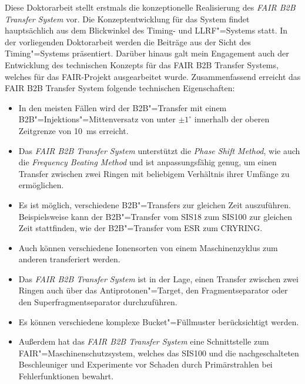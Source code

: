 Diese Doktorarbeit stellt erstmals die konzeptionelle Realisierung des \textit{FAIR B2B Transfer System} vor. Die Konzeptentwicklung für das System findet hauptsächlich aus dem Blickwinkel des Timing- und LLRF"=Systems statt. In der vorliegenden Doktorarbeit werden die Beiträge aus der Sicht des Timing"=Systems präsentiert. Darüber hinaus galt mein Engagement auch der Entwicklung des technischen Konzepts für das FAIR B2B Transfer Systems, welches für das FAIR-Projekt ausgearbeitet wurde. Zusammenfassend erreicht das FAIR B2B Transfer System folgende technischen Eigenschaften:
\begin{itemize}
\item In den meisten F\"allen wird der B2B"=Transfer mit einem B2B"=Injektions"=Mittenversatz von unter $\pm 1^\circ$ innerhalb der oberen Zeitgrenze von \SI{10}{\ms} erreicht. 
\item Das \textit{FAIR B2B Transfer System} unterst\"utzt die \textit{Phase Shift Method}, wie auch die \textit{Frequency Beating Method} und ist anpassungsf\"ahig genug, um einen Transfer zwischen zwei Ringen mit beliebigem Verh\"altnis ihrer Umf\"ange zu erm\"oglichen. 
\item Es ist m\"oglich, verschiedene B2B"=Transfers zur gleichen Zeit auszuf\"uhren. Beispielsweise kann der B2B"=Transfer vom SIS18 zum SIS100 zur gleichen Zeit stattfinden, wie der B2B"=Transfer vom ESR zum CRYRING. 
\item Auch k\"onnen verschiedene Ionensorten von einem Maschinenzyklus zum anderen transferiert werden. 
\item Das \textit{FAIR B2B Transfer System} ist in der Lage, einen Transfer zwischen zwei Ringen auch \"uber das Antiprotonen"=Target, den Fragmentseparator oder den Superfragmentseparator durchzuf\"uhren. 
\item Es k\"onnen verschiedene komplexe Bucket"=F\"ullmuster ber\"ucksichtigt werden. 
\item Au\ss{}erdem hat das \textit{FAIR B2B Transfer System} eine Schnittstelle zum FAIR"=Maschinenschutzsystem, welches das SIS100 und die nachgeschalteten Beschleuniger und Experimente vor Schaden durch Prim\"arstrahlen bei Fehlerfunktionen bewahrt. 
\end{itemize}


